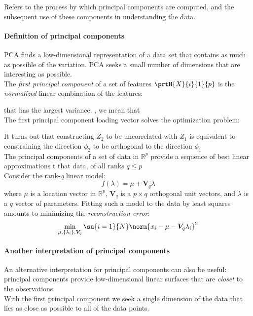 Refers to the process by which principal components are computed, and
the subsequent use of these components in understanding the data.

\paragraph{Definition of principal components}
PCA finds a low-dimensional representation of a data set that contains
as much as possible of the variation. PCA seeks a small number of 
dimensions that are interesting as possible.\\

The \emph{first principal component} of a set of features 
$\prtH{X}{i}{1}{p}$ is the \emph{normalized} linear combination of the
features:
\begin{center}
\end{center}
that has the largest variance. , we mean that 
 \\

The first principal component loading vector solves the optimization
problem:
\begin{center}
\end{center}
It turns out that constructing $Z_{2}$ to be uncorrelated with $Z_{1}$
is equivalent to constraining the direction $\phi_{2}$ to be orthogonal
to the direction $\phi_{1}$\\

The principal components of a set of data in $\mathbb{R}^{p}$ provide a sequence of best linear
approximations t that data, of all ranks $q\leq p$\\
Consider the rank-\emph{q} linear model:
$$ f(\lambda)=\mu + \bm{V}_{q}\lambda$$
where $\mu$ is a location vector in $\mathbb{R}^{p}$, $\bm{V}_{q}$ is a $p\times q$ orthogonal
unit vectors, and $\lambda$ is a $q$ vector of parameters. Fitting such a model to the data by
least squares amounts to minimizing the \textit{reconstruction error}:
$$ \min\limits_{\mu,\{\lambda_{i}\},\bm{V}_{q}}\su{{i=1}}{N}\norm{x_{i}-\mu-\bm{V}_{q}\lambda_{i}}
^{2}$$

\paragraph{Another interpretation of principal components}
An alternative interpretation for principal components can also be 
useful: principal components provide low-dimensional linear surfaces
that are \emph{closet} to the observations.\\
With the first principal component we seek a single dimension of the 
data that lies as close as possible to all of the data points.

